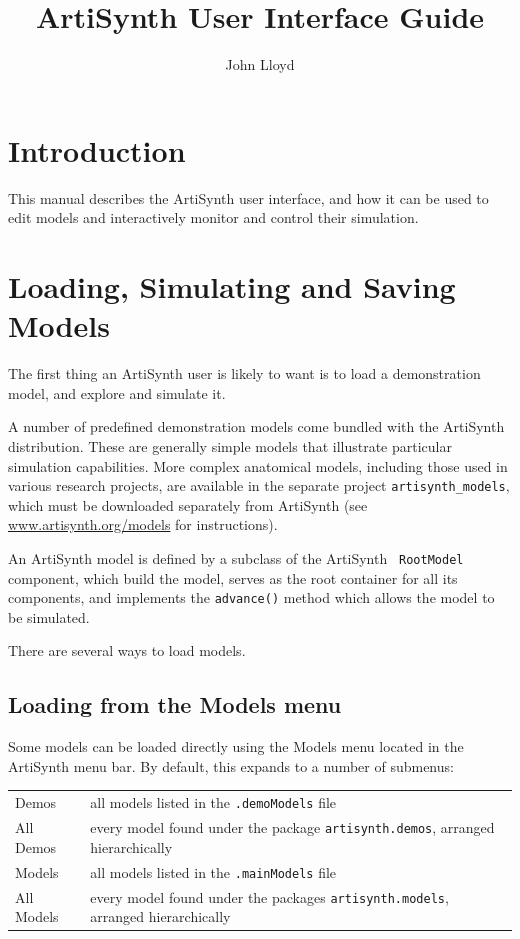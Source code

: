 \documentclass{article}
\title{ArtiSynth User Interface Guide}
\author{John Lloyd}
\date{}
\begin{document}
\maketitle

\iflatexml{\large\pubdate}\fi

\tableofcontents

\section{Introduction}

This manual describes the ArtiSynth user interface, and how it can be
used to edit models and interactively monitor and control their
simulation.

\section{Loading, Simulating and Saving Models}

The first thing an ArtiSynth user is likely to want is to load a
demonstration model, and explore and simulate it.

A number of predefined demonstration models come bundled with the
ArtiSynth distribution. These are generally simple models that
illustrate particular simulation capabilities. More complex
anatomical models, including those used in various research projects,
are available in the separate project {\tt artisynth\_models}, which
must be downloaded separately from ArtiSynth (see
\href{http://www.artisynth.org/models}{www.artisynth.org/models} 
for instructions).

An ArtiSynth model is defined by a subclass of the ArtiSynth {\tt
RootModel} component, which build the model, serves as the root
container for all its components, and implements the {\tt advance()}
method which allows the model to be simulated.

There are several ways to load models.

\subsection{Loading from the Models menu}
\label{LoadingFromModelsMenu}

Some models can be loaded directly using the {\sf Models} menu located
in the ArtiSynth menu bar. By default, this expands to a number of
submenus:

\begin{tabular}{ll}
{\sf Demos} & all models listed in the {\tt .demoModels} file\\
{\sf All Demos} & every model found under the package {\tt artisynth.demos}, 
arranged hierarchically\\
{\sf Models} & all models listed in the {\tt .mainModels} file\\
{\sf All Models} & every model found under the packages 
{\tt artisynth.models}, arranged hierarchically
\end{tabular}
\medskip
\end{document}
